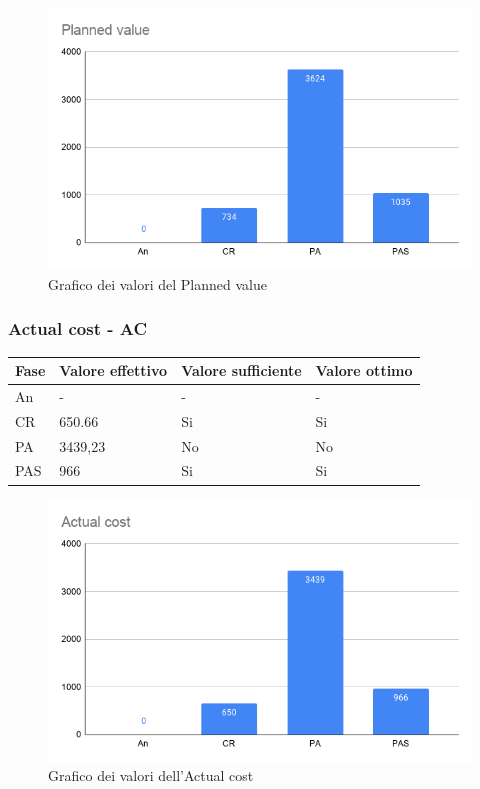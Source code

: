     \begin{figure}[H]
        \centering
        \includegraphics[width=10 cm]{source/sections/images/planned_value.png}
        \caption{Grafico dei valori del Planned value}
    \end{figure}

\subsubsection{Actual cost - AC}

\begin{longtabu} to \textwidth {| X[0.1,c m] | X[0.1,c m] | X[0.1,c m] | X[0.1,c m] |}
    \hline
    \textbf{Fase} &
    \textbf{Valore effettivo} & 
    \textbf{Valore sufficiente} & 
    \textbf{Valore ottimo} \\
    \hline
    An & - & - & - \\
    \hline
    CR & 650.66 & Si & Si \\ 
    \hline    
    PA & 3439,23 & No & No \\
    \hline 
    PAS & 966 & Si & Si \\
    \hline
    \end{longtabu}

    \begin{figure}[H]
        \centering
        \includegraphics[width=10 cm]{source/sections/images/actual_cost.png}
        \caption{Grafico dei valori dell'Actual cost}
    \end{figure}

